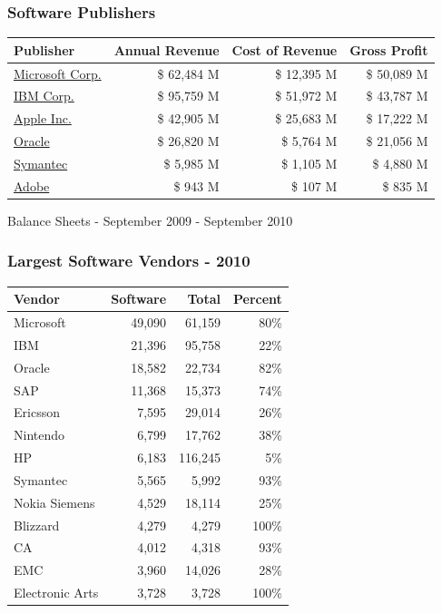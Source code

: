 \documentclass[18pt]{beamer}
\begin{document}
\begin{frame}
\frametitle{Software Publishers}

\begin{tabular}{lrrr}
\hline
\textbf{Publisher} &	\textbf{Annual Revenue} & \textbf{Cost of Revenue} & \textbf{Gross Profit} \\
\hline
\hline
\href{http://www.google.com/finance?fstype=ii\&q=NASDAQ:MSFT}{Microsoft Corp.}	& \$ 62,484 M & \$ 12,395 M  & \$ 50,089 M  \\
\hline
\href{http://www.google.com/finance?q=NYSE:IBM\&fstype=ii}{IBM Corp.} & \$ 95,759 M & \$ 51,972 M & \$ 43,787 M \\
\hline
\href{http://www.google.com/finance?q=NASDAQ:AAPL\&fstype=ii}{Apple Inc.} & \$ 42,905 M & \$ 25,683 M & \$ 17,222 M \\
\hline
\href{http://www.google.com/finance?q=NASDAQ:ORCL\&fstype=ii}{Oracle} & \$ 26,820 M & \$ 5,764 M & \$ 21,056 M \\
\hline
\href{http://www.google.com/finance?q=NASDAQ:SYMC\&fstype=ii}{Symantec}	&	\$ 5,985 M & \$ 1,105 M & \$ 4,880 M \\
\hline
\href{http://www.google.com/finance?q=NASDAQ:ADBE\&fstype=ii}{Adobe} & \$ 943 M & \$ 107 M & \$ 835 M \\
\hline
\end{tabular}

\bigskip
\begin{center}
Balance Sheets - September 2009 - September 2010
\end{center}

\end{frame}


\begin{frame}
\frametitle{Largest Software Vendors - 2010}

\begin{center}
\begin{tabular}{lrrr}
\hline
\textbf{Vendor} &	\textbf{Software} & \textbf{Total} & \textbf{Percent} \\
\hline
\hline
 Microsoft & 49,090  & 61,159 &  80\% \\
 IBM & 21,396  & 95,758  & 22\% \\
 Oracle & 18,582  & 22,734 &  82\% \\
 SAP & 11,368  & 15,373 &  74\% \\
 Ericsson & 7,595  & 29,014 &  26\% \\
 Nintendo & 6,799  &  17,762 &  38\% \\
 HP & 6,183  &  116,245 &  5\% \\
 Symantec & 5,565  & 5,992 &  93\% \\
 Nokia Siemens & 4,529  &  18,114 &  25\% \\
 Blizzard & 4,279  & 4,279 & 100\% \\
 CA & 4,012  & 4,318 & 93\% \\
 EMC & 3,960  & 14,026 & 28\% \\
 Electronic Arts & 3,728  &  3,728 & 100\% \\
\end{tabular}
\end{center}
\end{frame}
\end{document}
